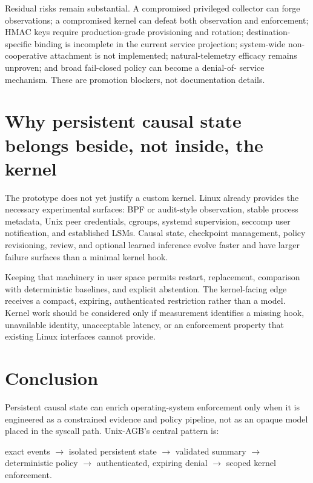 \documentclass[11pt,a4paper]{article}
\begin{document}
Residual risks remain substantial. A compromised privileged collector can
forge observations; a compromised kernel can defeat both observation and
enforcement; HMAC keys require production-grade provisioning and rotation;
destination-specific binding is incomplete in the current service projection;
system-wide non-cooperative attachment is not implemented; natural-telemetry
efficacy remains unproven; and broad fail-closed policy can become a denial-of-
service mechanism. These are promotion blockers, not documentation details.

\section{Why persistent causal state belongs beside, not inside, the kernel}

The prototype does not yet justify a custom kernel. Linux already provides the
necessary experimental surfaces: BPF or audit-style observation, stable process
metadata, Unix peer credentials, cgroups, systemd supervision, seccomp user
notification, and established LSMs. Causal state, checkpoint management,
policy revisioning, review, and optional learned inference evolve faster and
have larger failure surfaces than a minimal kernel hook.

Keeping that machinery in user space permits restart, replacement, comparison
with deterministic baselines, and explicit abstention. The kernel-facing edge
receives a compact, expiring, authenticated restriction rather than a model.
Kernel work should be considered only if measurement identifies a missing hook,
unavailable identity, unacceptable latency, or an enforcement property that
existing Linux interfaces cannot provide.

\section{Conclusion}

Persistent causal state can enrich operating-system enforcement only when it is
engineered as a constrained evidence and policy pipeline, not as an opaque model
placed in the syscall path. Unix-AGB's central pattern is:

\begin{center}
exact events $\rightarrow$ isolated persistent state $\rightarrow$ validated
summary $\rightarrow$ deterministic policy $\rightarrow$ authenticated,
expiring denial $\rightarrow$ scoped kernel enforcement.
\end{center}
\end{document}
